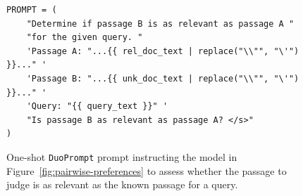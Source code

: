 \begin{figure}[t]
    \centering
    \begin{tcolorbox}[title=DuoPrompt, width=\textwidth]
        \footnotesize
        \begin{verbatim}
PROMPT = (
    "Determine if passage B is as relevant as passage A "
    "for the given query. "
    'Passage A: "...{{ rel_doc_text | replace("\\"", "\'") }}..." '
    'Passage B: "...{{ unk_doc_text | replace("\\"", "\'") }}..." '
    'Query: "{{ query_text }}" '
    "Is passage B as relevant as passage A? </s>"
)
        \end{verbatim}
    \end{tcolorbox}
    \caption{One-shot \texttt{DuoPrompt} prompt instructing the model in Figure~\ref{fig:pairwise-preferences} to assess whether the passage to judge is as relevant as the known passage for a query.}
    \label{fig:oneshot-prompt}
\end{figure}


